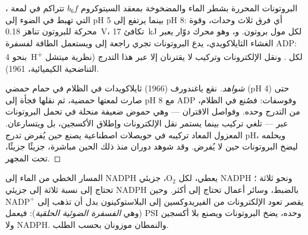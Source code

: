 \begin{theorem}\label{thm:b1:photosynthesis:chemiosmosis}
البروتونات المحررة بشطر الماء والمضخوخة بمعقد السيتوكروم $b_6f$
تتراكم في لمعة ، التي تهبط في الضوء إلى pH 5 بينما يرتفع
 إلى pH 8: أي فرق ثلاث وحدات، وقوة محركة للبروتون تناهز
\qty{0.18}{V}، تكافئ \qty{17}{kJ} لكل مول بروتون. و\emph{}،
وهو محرك دوّار يعبر الغشاء الثايلاكويدي، يدع البروتونات تجري راجعة
إلى  ويستعمل الطاقة لفسفرة ADP: بنحو \qty{4}{H^+} لكل .
ونقل الإلكترونات وتركيب  لا يقترنان إلا عبر هذا التدرج (نظرية
ميتشل التناضحية الكيميائية، 1961).
\end{theorem}
\begin{proof}[شواهد]
نقع ياغندورف (1966) ثايلاكويدات في الظلام في حمام حمضي (pH 4) حتى
صارت لمعتها حمضية، ثم نقلها فجأة إلى pH 8 مع ADP وفوسفات: فصُنع 
في الظلام، من التدرج وحده. وفواصل الاقتران --- وهي حموض ضعيفة منحلة
في  تحمل البروتونات عبر  --- تلغي تركيب  بينما يستمر
نقل الإلكترونات وإطلاق الأكسجين، بل ويتسارعان.  المعزول
المعاد تركيبه في حويصلات اصطناعية يصنع  حين يُفرض تدرج pH، ويحلمه
 ليضخ البروتونات حين لا يُفرض. وقد شوهد دوران  منذ ذلك
الحين مباشرة، جزيئًا جزيئًا، تحت المجهر.
\end{proof}

\begin{example}\label{ex:b1:photosynthesis:cyclic}
المسار الخطي من الماء إلى NADPH يعطي، لكل $\mathrm{O_2}$، جزيئي
NADPH ونحو ثلاثة ؛  تحتاج إلى نسبة ثلاثة  إلى
جزيئي NADPH بالضبط، وسائر أعمال  تحتاج إلى  أكثر. وحين
يقصر  تعود الإلكترونات من الفيريدوكسين إلى البلاستوكينون بدل أن
تذهب إلى $\mathrm{NADP^+}$ (وهي \emph{الفسفرة الضوئية الحلقية}):
فيعمل PSI وحده، يضخ البروتونات ويصنع  بلا أكسجين ولا NADPH.
والنمطان موزونان بحسب الطلب.
\end{example}

